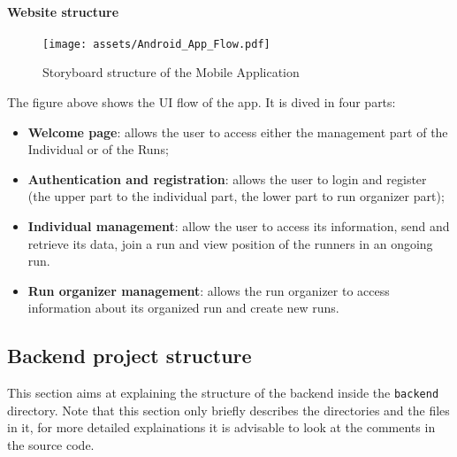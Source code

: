 \paragraph{Website structure}
\begin{figure}[H]
	\texttt{[image: assets/Android\_App\_Flow.pdf]}
	\caption{Storyboard structure of the Mobile Application}
	\label{fig:StoryBoard}
\end{figure}
The figure above shows the UI flow of the app.
It is dived in four parts:
\begin{itemize}
    \item \textbf{Welcome page}: allows the user to access either the management part of the Individual or of the Runs;
    \item \textbf{Authentication and registration}: allows the user to login and register (the upper part to the individual part, the lower part to run organizer part);
    \item \textbf{Individual management}: allow the user to access its information, send and retrieve its data, join a run and view position of the runners in an ongoing run.
    \item \textbf{Run organizer management}: allows the run organizer to access information about its organized run and create new runs.
\end{itemize}



\subsection{Backend project structure}
This section aims at explaining the structure of the backend inside the \texttt{backend} directory.
Note that this section only briefly describes the directories and the files in it, for more detailed explainations it is advisable to look at the comments in the source code.

